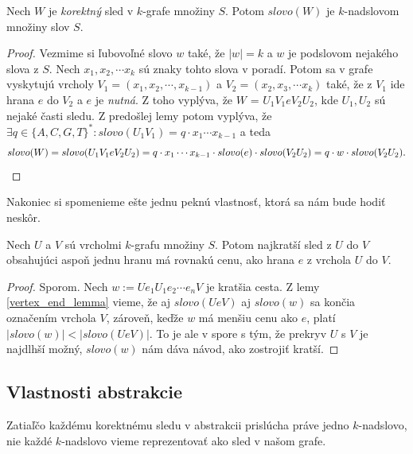 \begin{veta}
    Nech $W$ je \emph{korektný} sled v $k$-grafe množiny $S$. Potom $slovo(W)$ je $k$-nadslovom množiny slov $S$.
\end{veta}

\begin{proof}
Vezmime si ľubovoľné slovo $w$ také, že $|w| = k$ a $w$ je podslovom nejakého slova z $S$. Nech $x_1, x_2, \cdots x_k$
sú znaky tohto slova v poradí. Potom sa v grafe vyskytujú vrcholy $V_1 = (x_1, x_2, \cdots, x_{k-1})$ a $V_2 = (x_2, x_3, \cdots x_k)$ také,
že z $V_1$ ide hrana $e$ do $V_2$ a $e$ je \emph{nutná}. Z toho vyplýva, že $W$ = $U_1 V_1 e V_2 U_2$, kde $U_1, U_2$ sú nejaké časti sledu.
Z predošlej lemy potom vyplýva, že $\exists q \in \{A,C,G,T \}^*: slovo(U_1 V_1) =  q \cdot x_1 \cdots x_{k - 1}$ a teda
$$slovo(W) = slovo(U_1 V_1 e V_2 U_2) = q \cdot x_1 \cdots x_{k - 1} \cdot slovo(e) \cdot slovo (V_2 U_2) = q \cdot w \cdot slovo(V_2 U_2).\qedhere$$
\end{proof}

Nakoniec si spomenieme ešte jednu peknú vlastnosť, ktorá sa nám bude hodiť neskôr.

\begin{lema}
\label{shortest_edge_lemma}
    Nech $U$ a $V$ sú vrcholmi $k$-grafu množiny $S$. Potom najkratší sled z $U$
    do $V$ obsahujúci aspoň jednu hranu má rovnakú cenu, ako hrana $e$ z vrchola $U$ do $V$.
\end{lema}

\begin{proof}
    Sporom. Nech $w := U e_1 U_1 e_2 \cdots e_n V$ je kratšia cesta. Z lemy \ref{vertex_end_lemma} vieme,
    že aj $slovo(U e V)$ aj $slovo(w)$ sa končia označením vrchola $V$, zároveň, keďže $w$ má
    menšiu cenu ako $e$, platí $|slovo(w)| < |slovo(U e V)|$. To je ale v spore s tým, že prekryv
    $U$ s $V$ je najdlhší možný, $slovo(w)$ nám dáva návod, ako zostrojiť kratší.
\end{proof}

\subsection{Vlastnosti abstrakcie}

Zatiaľčo každému korektnému sledu v abstrakcii prislúcha práve jedno $k$-nadslovo, nie
každé $k$-nadslovo vieme reprezentovať ako sled v našom grafe.

